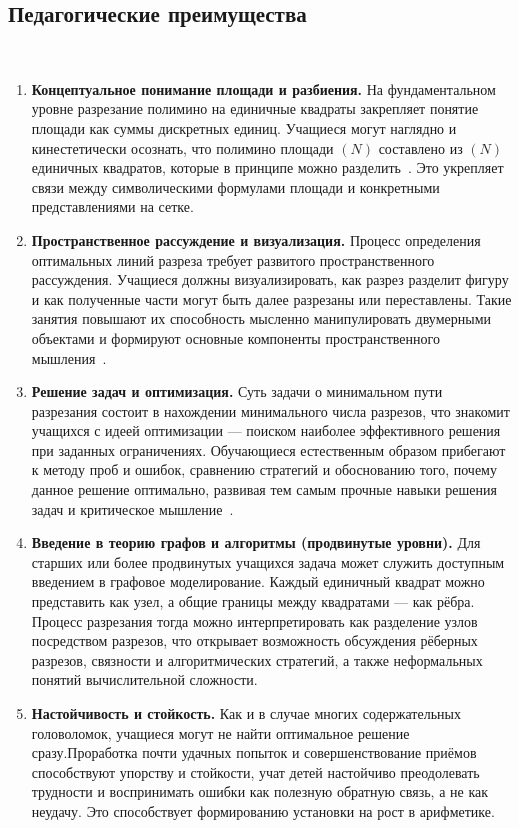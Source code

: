 \documentclass[a4paper,14pt]{extreport}
\theoremstyle{plain}
\theoremstyle{definition}
\theoremstyle{remark}
\begin{document}
\subsection{Педагогические преимущества}~\label{sec4.2.1}

\begin{enumerate}
	\item \textbf{Концептуальное понимание площади и разбиения.}
	На фундаментальном уровне разрезание полимино на единичные квадраты закрепляет понятие площади как суммы дискретных единиц. Учащиеся могут наглядно и кинестетически осознать, что полимино площади $(N)$ составлено из $(N)$ единичных квадратов, которые в принципе можно разделить~\cite{Boaler}. Это укрепляет связи между символическими формулами площади и конкретными представлениями на сетке. 
	
	\item \textbf{Пространственное рассуждение и визуализация.}
	Процесс определения оптимальных линий разреза требует развитого пространственного рассуждения. Учащиеся должны визуализировать, как разрез разделит фигуру и как полученные части могут быть далее разрезаны или переставлены. Такие занятия повышают их способность мысленно манипулировать двумерными объектами и формируют основные компоненты пространственного мышления~\cite{Puig}. 
	
	\item \textbf{Решение задач и оптимизация.}
	Суть задачи о минимальном пути разрезания состоит в нахождении минимального числа разрезов, что знакомит учащихся с идеей оптимизации --- поиском наиболее эффективного решения при заданных ограничениях. Обучающиеся естественным образом прибегают к методу проб и ошибок, сравнению стратегий и обоснованию того, почему данное решение оптимально, развивая тем самым прочные навыки решения задач и критическое мышление~\cite{Ahdhianto}. 
	
	\item \textbf{Введение в теорию графов и алгоритмы (продвинутые уровни).}
	Для старших или более продвинутых учащихся задача может служить доступным введением в графовое моделирование. Каждый единичный квадрат можно представить как узел, а общие границы между квадратами --- как рёбра. Процесс разрезания тогда можно интерпретировать как разделение узлов посредством разрезов, что открывает возможность обсуждения рёберных разрезов, связности и алгоритмических стратегий, а также неформальных понятий вычислительной сложности.
	
	\item \textbf{Настойчивость и стойкость.}
	Как и в случае многих содержательных головоломок, учащиеся могут не найти оптимальное решение сразу.Проработка почти удачных попыток и совершенствование приёмов способствуют упорству и стойкости, учат детей настойчиво преодолевать трудности и воспринимать ошибки как полезную обратную связь, а не как неудачу. Это способствует формированию установки на рост в арифметике.
\end{enumerate}
\end{document}
